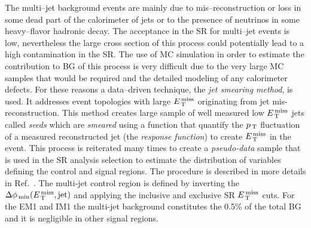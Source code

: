 The multi--jet background events are mainly due to mis--reconstruction or loss
in some dead part of the calorimeter of jets or to the presence of neutrinos in
some heavy--flavor hadronic decay. The acceptance in the SR for multi--jet
events is low, nevertheless the large cross section of this process could
potentially lead to a high contamination in the SR\@. The use of MC simulation
in order to estimate the contribution to BG of this process is very difficult
due to the very large MC samples that would be required and the detailed
modeling of any calorimeter defects. For these reasons a data--driven technique,
the \emph{jet smearing method}, is used. It addresses event topologies with
large $E_\mathrm{\, T}^\mathrm{\, miss}$ originating from jet mis-reconstruction. This method creates large
sample of well measured low $E_\mathrm{\, T}^\mathrm{\, miss}$ jets called \emph{seeds} which are
\emph{smeared} using a function that quantify the $p_\mathrm{\, T}$ fluctuation of a
measured reconstructed jet (the \emph{response function}) to create $E_\mathrm{\, T}^\mathrm{\, miss}$ in
the event. This process is reiterated many times to create a \emph{pseudo-data}
sample that is used in the SR analysis selection to estimate the distribution of
variables defining the control and signal regions. The procedure is described in
more details in Ref.~\cite{JetSmearing}. The multi-jet control region is defined
by inverting the $\Delta \phi_\mathrm{\, min} (E_\mathrm{\, T}^\mathrm{\, miss}, \mathrm{jet})$ and applying
the inclusive and exclusive SR $E_\mathrm{\, T}^\mathrm{\, miss}$ cuts. For the EM1 and IM1 the multi-jet
background constitutes the 0.5\% of the total BG and it is negligible in other
signal regions.
